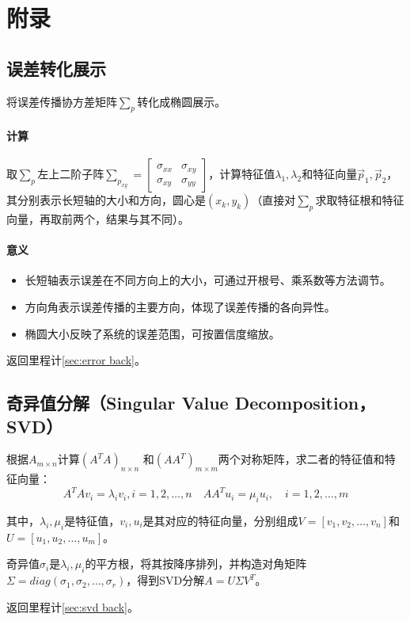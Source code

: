 \documentclass[
12pt, %
a4paper, 
oneside, %
]{scrartcl}
\begin{document}
\section{附录}
{\footnotesize
\subsection[误差转化展示]{误差转化展示}\label{sec:error}
将误差传播协方差矩阵$ \sum_p $转化成椭圆展示。
\paragraph{计算}
取$ \sum_p $左上二阶子阵$ \sum_{p_{xy}} = \begin{bmatrix} \sigma_{xx} & \sigma_{xy} \\ \sigma_{xy} & \sigma_{yy} \end{bmatrix} $，计算特征值$ \lambda_1, \lambda_2 $和特征向量$ \overrightarrow{p}_1, \overrightarrow{p}_2 $，其分别表示长短轴的大小和方向，圆心是$ (x_k, y_k) $（直接对$ \sum_p $求取特征根和特征向量，再取前两个，结果与其不同）。
\paragraph{意义}
\begin{itemize}
\item 长短轴表示误差在不同方向上的大小，可通过开根号、乘系数等方法调节。
\item 方向角表示误差传播的主要方向，体现了误差传播的各向异性。
\item 椭圆大小反映了系统的误差范围，可按置信度缩放。
\end{itemize}

返回里程计\ref{sec:error back}。
\subsection[奇异值分解]{奇异值分解（Singular Value Decomposition，SVD）}\label{sec:svd}
根据$ A_{m \times n} $计算$ (A^T A)_{n \times n} $ 和$ (A A^T)_{m \times m} $两个对称矩阵，求二者的特征值和特征向量：
$$ A^T A v_i = \lambda_i v_i, i = 1, 2, \dots, n \quad A A^T u_i = \mu_i u_i, \quad i = 1, 2, \dots, m $$

其中，$ \lambda_i, \mu_i $是特征值，$ v_i, u_i $是其对应的特征向量，分别组成$ V = [v_1, v_2, \dots, v_n] $和$ U = [u_1, u_2, \dots, u_m] $。

奇异值$ \sigma_i $是$ \lambda_i, \mu_i $的平方根，将其按降序排列，并构造对角矩阵$ \Sigma = diag(\sigma_1, \sigma_2, \dots, \sigma_r) $，得到SVD分解$ A = U \Sigma V^T $。

返回里程计\ref{sec:svd back}。
}
\end{document}
